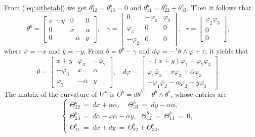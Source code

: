 \documentclass{amsart}
\numberwithin{equation}{section}
\theoremstyle{definition}
\renewcommand{\1}{\mathds{1}}
\renewcommand{\>}{\rightarrow}
\begin{document}
From (\ref{eq:aithetab}) we get $\theta^b_{12}=\theta^b_{13}=0$ and $\theta^b_{11}=\theta^b_{22} +\theta^b_{33}$. Then it follows that
\begin{equation*}
\theta^b = \begin{bmatrix} x+y & 0  & 0 \\ 0 & x & \alpha \\ 0 & -\overline{\alpha} &  y \end{bmatrix}\!\!, \ \ \ \
\gamma =  \begin{bmatrix} 0 & -\overline{\varphi}_3  & \overline{\varphi}_2 \\ \varphi_3 & 0 & 0 \\ -  \varphi_2 & 0 &  0 \end{bmatrix}\!\!, \ \ \
\tau = \begin{bmatrix} \varphi_2\varphi_3 \\ 0 \\ 0  \end{bmatrix}\!\!,
\end{equation*}
where $\overline{x}=-x$ and $\overline{y}=-y$. From $\theta = \theta^b-\gamma$ and $d\varphi = -\,^t\!\theta \wedge \varphi +\tau $, it yields that
\begin{equation*}
\theta = \begin{bmatrix}  x+y & \overline{\varphi}_3  & -\overline{\varphi}_2 \\ -\varphi_3 & x & \alpha \\ \varphi_2 & -\overline{\alpha} &  y \end{bmatrix}\!\!, \ \ \ \ d\varphi  = \begin{bmatrix}  -(x+y)\varphi_1 - \varphi_2\varphi_3 \\ \varphi_1 \overline{\varphi}_3 - x \varphi_2 +\overline{\alpha} \varphi_3  \\ - \varphi_1 \overline{\varphi}_2 - \alpha \varphi_2 -y \varphi_3  \end{bmatrix}\!\!.
\end{equation*}
The matrix of the curvature of $\nabla^b$ is $\Theta^b=d \theta^b - \theta^b \wedge \theta^b$, whose entries are
\begin{equation} \label{eq:7.1}
\left\{ \begin{array}{lll}  \Theta^b_{22} \ = \ dx + \alpha \overline{\alpha}, \ \ \ \ \ \Theta^b_{33} \ = \ dy - \alpha \overline{\alpha}, \\
 \Theta^b_{23} \ = \ d\alpha  - x \alpha - \alpha y, \ \ \  \Theta^b_{12} \ = \ \Theta^b_{13} \ = \ 0, \\
 \Theta^b_{11} \ = \ dx+dy \ = \  \Theta^b_{22}+ \Theta^b_{33}.
 \end{array} \right.
\end{equation}
\end{document}
